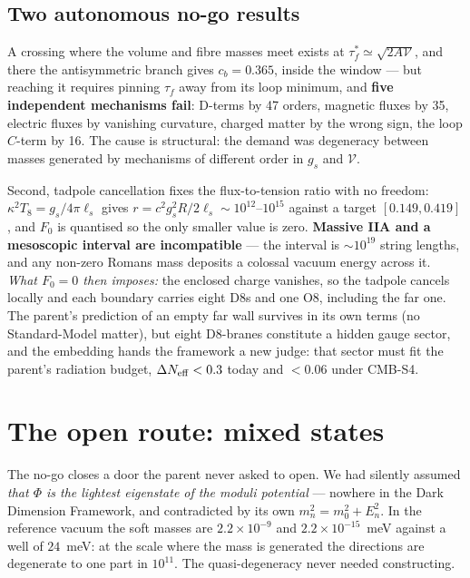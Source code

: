 \subsection{Two autonomous no-go results}
A crossing where the volume and fibre masses meet exists at $\tau_f^*\simeq\sqrt{2A\mathcal V}$, and there the antisymmetric branch gives $c_b=0.365$, inside the window --- but reaching it requires pinning $\tau_f$ away from its loop minimum, and \textbf{five independent mechanisms fail}: D-terms by 47 orders, magnetic fluxes by 35, electric fluxes by vanishing curvature, charged matter by the wrong sign, the loop $C$-term by 16. The cause is structural: the demand was degeneracy between masses generated by mechanisms of different order in $g_s$ and $\mathcal V$.

Second, tadpole cancellation fixes the flux-to-tension ratio with no freedom: $\kappa^2T_8=g_s/4\pi\ell_s$ gives $r=c^2g_s^2R/2\ell_s\sim10^{12}$--$10^{15}$ against a target $[0.149,0.419]$, and $F_0$ is quantised so the only smaller value is zero. \textbf{Massive IIA and a mesoscopic interval are incompatible} --- the interval is $\sim10^{19}$ string lengths, and any non-zero Romans mass deposits a colossal vacuum energy across it. \emph{What $F_0=0$ then imposes:} the enclosed charge vanishes, so the tadpole cancels locally and each boundary carries eight D8s and one O8, including the far one. The parent's prediction of an empty far wall survives in its own terms (no Standard-Model matter), but eight D8-branes constitute a hidden gauge sector, and the embedding hands the framework a new judge: that sector must fit the parent's radiation budget, $\Delta N_{\rm eff}<0.3$ today and $<0.06$ under CMB-S4.

\section{The open route: mixed states}
The no-go closes a door the parent never asked to open. We had silently assumed \emph{that $\Phi$ is the lightest eigenstate of the moduli potential} --- nowhere in the Dark Dimension Framework, and contradicted by its own $m_n^2=m_0^2+E_n^2$. In the reference vacuum the soft masses are $2.2\times10^{-9}$ and $2.2\times10^{-15}$~meV against a well of $24$~meV: at the scale where the mass is generated the directions are degenerate to one part in $10^{11}$. The quasi-degeneracy never needed constructing.

